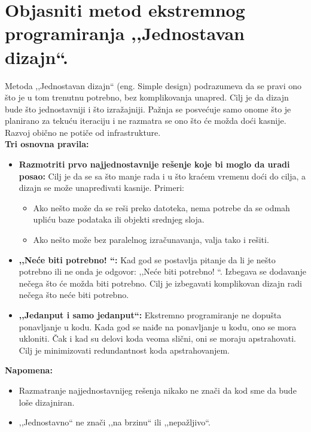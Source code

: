 \documentclass[a4paper]{article}
\begin{document}
\section{Objasniti metod ekstremnog programiranja ,,Jednostavan dizajn``.}
  Metoda ,,Jednostavan dizajn`` (eng. Simple design) podrazumeva da se pravi ono što je u tom
  trenutnu potrebno, bez komplikovanja unapred. Cilj je da dizajn bude što jednostavniji i što
  izražajniji. Pažnja se posvećuje samo onome što je planirano za tekuću iteraciju i ne razmatra
  se ono što će možda doći kasnije. Razvoj obično ne potiče od infrastrukture. \\
  \textbf{Tri osnovna pravila:}
  \begin{itemize}
    \item \textbf{Razmotriti prvo najjednostavnije rešenje koje bi moglo da uradi posao:}
          Cilj je da se sa što manje rada i u što kraćem vremenu doći do cilja, a dizajn se
          može unapređivati kasnije. Primeri:
          \begin{itemize}
            \item Ako nešto može da se reši preko datoteka, nema potrebe da se odmah upliću
                  baze podataka ili objekti srednjeg sloja.
            \item Ako nešto može bez paralelnog izračunavanja, valja tako i rešiti.
          \end{itemize}
    \item \textbf{,,Neće biti potrebno! ``:} Kad god se postavlja pitanje da li je nešto potrebno 
          ili ne onda je odgovor: ,,Neće biti potrebno! ``. Izbegava se dodavanje nečega što će možda 
          biti potrebno. Cilj je izbegavati komplikovan dizajn radi nečega što neće biti potrebno.
    \item \textbf{,,Jedanput i samo jedanput``:} Ekstremno programiranje ne dopušta ponavljanje u kodu.
          Kada god se naiđe na ponavljanje u kodu, ono se mora ukloniti. Čak i kad su delovi koda
          veoma slični, oni se moraju apstrahovati. Cilj je minimizovati redundantnost koda
          apstrahovanjem.
  \end{itemize}
  \textbf{Napomena:}
  \begin{itemize}
    \item Razmatranje najjednostavnijeg rešenja nikako ne znači da kod sme da bude loše dizajniran.
    \item ,,Jednostavno`` ne znači ,,na brzinu`` ili ,,nepažljivo``.
  \end{itemize}
\end{document}
